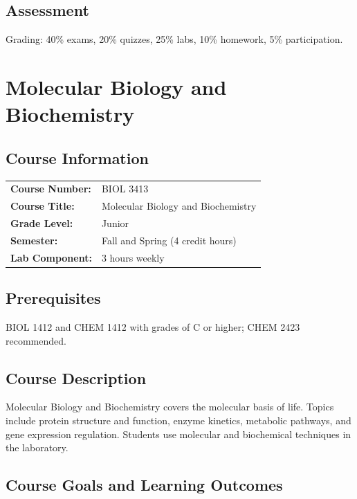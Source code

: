\documentclass[12pt,oneside]{book}
\begin{document}
\section{Assessment}

Grading: 40\% exams, 20\% quizzes, 25\% labs, 10\% homework, 5\% participation.


\chapter{Molecular Biology and Biochemistry}

\section{Course Information}

\begin{tabular}{ll}
\textbf{Course Number:} & BIOL 3413 \\
\textbf{Course Title:} & Molecular Biology and Biochemistry \\
\textbf{Grade Level:} & Junior \\
\textbf{Semester:} & Fall and Spring (4 credit hours) \\
\textbf{Lab Component:} & 3 hours weekly \\
\end{tabular}

\section{Prerequisites}

BIOL 1412 and CHEM 1412 with grades of C or higher; CHEM 2423 recommended.

\section{Course Description}

Molecular Biology and Biochemistry covers the molecular basis of life. Topics include protein structure and function, enzyme kinetics, metabolic pathways, and gene expression regulation. Students use molecular and biochemical techniques in the laboratory.

\section{Course Goals and Learning Outcomes}
\end{document}
